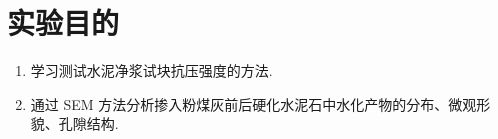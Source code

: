 
\section{实验目的}

\begin{enumerate}
  \item 学习测试水泥净浆试块抗压强度的方法.
  \item 通过 SEM 方法分析掺入粉煤灰前后硬化水泥石中水化产物的分布、微观形貌、孔隙结构.
\end{enumerate}
